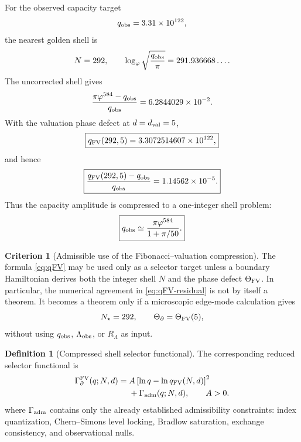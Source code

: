 \documentclass[aps,prd,reprint,nofootinbib,superscriptaddress,floatfix]{revtex4-2}
\numberwithin{equation}{section}
\theoremstyle{definition}
\newtheorem{definition}{Definition}[section]
\newtheorem{criterion}{Criterion}[section]
\theoremstyle{plain}
\begin{document}
For the observed capacity target
\[
q_{\rm obs}=3.31\times10^{122},
\]
the nearest golden shell is
\[
N=292,
\qquad
\log_\varphi\sqrt{\frac{q_{\rm obs}}{\pi}}
=
291.936668\ldots .
\]
The uncorrected shell gives
\begin{equation}
\frac{\pi\varphi^{584}-q_{\rm obs}}{q_{\rm obs}}
=
6.2844029\times10^{-2}.
\end{equation}
With the valuation phase defect at \(d=d_{\rm val}=5\),
\begin{equation}
\boxed{
q_{\rm FV}(292,5)
=
3.3072514607\times10^{122},
}
\end{equation}
and hence
\begin{equation}
\boxed{
\frac{q_{\rm FV}(292,5)-q_{\rm obs}}{q_{\rm obs}}
=
1.14562\times10^{-5}.
}
\label{eq:qFV-residual}
\end{equation}
Thus the capacity amplitude is compressed to a one-integer shell problem:
\begin{equation}
\boxed{
q_{\rm obs}
\simeq
\frac{\pi\varphi^{584}}{1+\pi/50}.
}
\end{equation}

\begin{criterion}[Admissible use of the Fibonacci--valuation compression]
The formula \eqref{eq:qFV} may be used only as a selector target unless a boundary Hamiltonian derives both the integer shell \(N\) and the phase defect \(\Theta_{\rm FV}\).  In particular, the numerical agreement in \eqref{eq:qFV-residual} is not by itself a theorem.  It becomes a theorem only if a microscopic edge-mode calculation gives
\[
N_\star=292,
\qquad
\Theta_\partial=\Theta_{\rm FV}(5),
\]
without using \(q_{\rm obs}\), \(\Lambda_{\rm obs}\), or \(R_\Lambda\) as input.
\end{criterion}

\begin{definition}[Compressed shell selector functional]
The corresponding reduced selector functional is
\begin{equation}
\begin{aligned}
\Gamma_{\partial}^{\rm FV}(q;N,d)
={}&
A\left[
\ln q-\ln q_{\rm FV}(N,d)
\right]^2\\
&+\Gamma_{\rm adm}(q;N,d),
\qquad A>0 .
\end{aligned}
\end{equation}
where \(\Gamma_{\rm adm}\) contains only the already established admissibility constraints: index quantization, Chern--Simons level locking, Bradlow saturation, exchange consistency, and observational nulls.
\end{definition}
\end{document}
